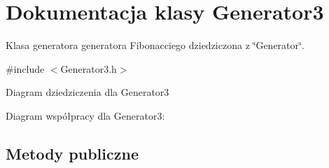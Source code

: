 \hypertarget{classGenerator3}{\section{Dokumentacja klasy Generator3}
\label{classGenerator3}
}


Klasa generatora generatora Fibonacciego dziedziczona z \char`\"{}\+Generator\char`\"{}.  




{\ttfamily \#include $<$Generator3.\+h$>$}



Diagram dziedziczenia dla Generator3


Diagram współpracy dla Generator3\+:
\subsection*{Metody publiczne}
